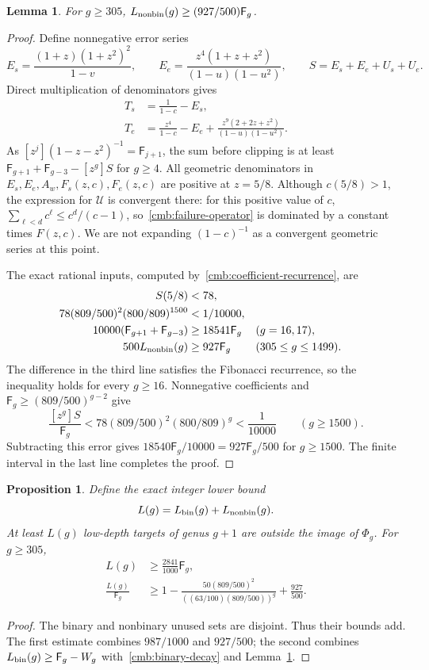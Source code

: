 \documentclass[11pt]{amsart}
\newtheorem{lemma}[theorem]{Lemma}
\newtheorem{proposition}[theorem]{Proposition}
\theoremstyle{definition}
\theoremstyle{remark}
\newcommand{\Fib}{\mathsf F}
\numberwithin{equation}{section}
\begin{document}
\begin{lemma}\label{cmb:nonbinary-numerical}
For $g\ge305$, $L_{\rm nonbin}(g)\ge(927/500)\Fib_g$.
\end{lemma}
\begin{proof}
Define nonnegative error series
\[
 E_s=\frac{(1+z)(1+z^2)^2}{1-v},\qquad
 E_e=\frac{z^4(1+z+z^2)}{(1-u)(1-u^2)},\qquad S=E_s+E_e+U_s+U_e.
\]
Direct multiplication of denominators gives
\begin{align*}
 T_s&=\frac1{1-c}-E_s,\\
 T_e&=\frac{z^4}{1-c}-E_e+
       \frac{z^9(2+2z+z^2)}{(1-u)(1-u^2)}.
\end{align*}
As $[z^j](1-z-z^2)^{-1}=\Fib_{j+1}$, the sum before clipping is at least
$\Fib_{g+1}+\Fib_{g-3}-[z^g]S$ for $g\ge4$.
All geometric denominators in $E_s,E_e,A_w,F_s(z,c),F_e(z,c)$ are
positive at $z=5/8$. Although $c(5/8)>1$, the expression for $\mathcal U$ is convergent
there: for this positive value of $c$,
$\sum_{\ell<d}c^\ell\le c^d/(c-1)$, so~\eqref{cmb:failure-operator}
is dominated by a constant times $F(z,c)$. We are not expanding
$(1-c)^{-1}$ as a convergent geometric series at this point.

The exact rational inputs, computed by~\eqref{cmb:coefficient-recurrence}, are
\begin{align*}
 S(5/8)&<78,\\
 78(809/500)^2(800/809)^{1500}&<1/10000,\\
 10000(\Fib_{g+1}+\Fib_{g-3})&\ge18541\Fib_g &&(g=16,17),\\
 500L_{\rm nonbin}(g)&\ge927\Fib_g &&(305\le g\le1499).
\end{align*}
The difference in the third line satisfies the Fibonacci recurrence, so
the inequality holds for every $g\ge16$. Nonnegative coefficients and
$\Fib_g\ge(809/500)^{g-2}$ give
\[
 \frac{[z^g]S}{\Fib_g}<78(809/500)^2(800/809)^g<\frac1{10000}
 \qquad(g\ge1500).
\]
Subtracting this error gives $18540\Fib_g/10000=927\Fib_g/500$ for
$g\ge1500$. The finite interval in the last line completes the proof.
\end{proof}

\begin{proposition}\label{cmb:capacity}
Define the exact integer lower bound
\begin{equation}\label{cmb:L}
 L(g)=L_{\rm bin}(g)+L_{\rm nonbin}(g).
\end{equation}
At least $L(g)$ low-depth targets of genus $g+1$ are outside the image of
$\Phi_g$. For $g\ge305$,
\begin{align}
 L(g)&\ge\frac{2841}{1000}\Fib_g,\label{cmb:capacity-constant}\\
 \frac{L(g)}{\Fib_g}&\ge1-
 \frac{50(809/500)^2}{((63/100)(809/500))^g}+\frac{927}{500}.
 \label{cmb:capacity-improved}
\end{align}
\end{proposition}
\begin{proof}
The binary and nonbinary unused sets are disjoint. Thus their bounds add.
The first estimate combines $987/1000$ and $927/500$; the second combines
$L_{\rm bin}(g)\ge\Fib_g-W_g$ with~\eqref{cmb:binary-decay} and
Lemma~\ref{cmb:nonbinary-numerical}.
\end{proof}
\end{document}
